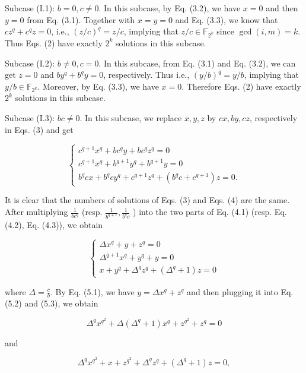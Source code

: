 \documentclass[10pt]{article}
\begin{document}
Subcase (I.1): $b=0, c \neq 0$. In this subcase, by Eq. (3.2), we have $x=0$ and then $y=0$ from Eq. (3.1). Together with $x=y=0$ and Eq. (3.3), we know that $c z^{q}+c^{q} z=0$, i.e., $(z / c)^{q}=z / c$, implying that $z / c \in \mathbb{F}_{2^{k}}$ since $\operatorname{gcd}(i, m)=k$. Thus Eqs. (2) have exactly $2^{k}$ solutions in this subcase.

Subcase (I.2): $b \neq 0, c=0$. In this subcase, from Eq. (3.1) and Eq. (3.2), we can get $z=0$ and $b y^{q}+b^{q} y=0$, respectively. Thus i.e., $(y / b)^{q}=y / b$, implying that $y / b \in \mathbb{F}_{2^{k}}$. Moreover, by Eq. (3.3), we have $x=0$. Therefore Eqs. (2) have exactly $2^{k}$ solutions in this subcase.

Subcase (I.3): $b c \neq 0$. In this subcase, we replace $x, y, z$ by $c x, b y, c z$, respectively in Eqs. (3) and get

\[
\left\{\begin{array}{l}
c^{q+1} x^{q}+b c^{q} y+b c^{q} z^{q}=0  \tag{4.1}\\
c^{q+1} x^{q}+b^{q+1} y^{q}+b^{q+1} y=0 \\
b^{q} c x+b^{q} c y^{q}+c^{q+1} z^{q}+\left(b^{q} c+c^{q+1}\right) z=0 .
\end{array}\right.
\]

It is clear that the numbers of solutions of Eqs. (3) and Eqs. (4) are the same. After multiplying $\frac{1}{b c^{q}}$ (resp. $\frac{1}{b^{q+1}}, \frac{1}{b^{q} c}$ ) into the two parts of Eq. (4.1) (resp. Eq. (4.2), Eq. (4.3)), we obtain

\[
\left\{\begin{array}{l}
\Delta x^{q}+y+z^{q}=0  \tag{5.1}\\
\Delta^{q+1} x^{q}+y^{q}+y=0 \\
x+y^{q}+\Delta^{q} z^{q}+\left(\Delta^{q}+1\right) z=0
\end{array}\right.
\]

where $\Delta=\frac{c}{b}$. By Eq. (5.1), we have $y=\Delta x^{q}+z^{q}$ and then plugging it into Eq. (5.2) and (5.3), we obtain


\begin{equation*}
\Delta^{q} x^{q^{2}}+\Delta\left(\Delta^{q}+1\right) x^{q}+z^{q^{2}}+z^{q}=0 \tag{6}
\end{equation*}


and


\begin{equation*}
\Delta^{q} x^{q^{2}}+x+z^{q^{2}}+\Delta^{q} z^{q}+\left(\Delta^{q}+1\right) z=0, \tag{7}
\end{equation*}
\end{document}
